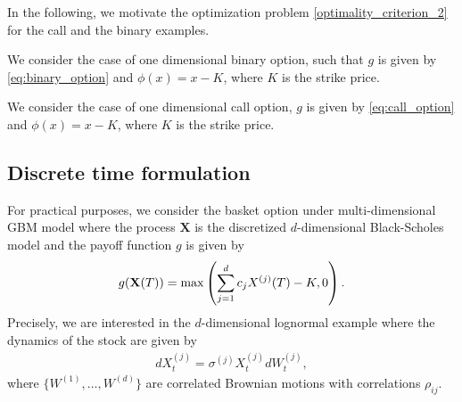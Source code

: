 In the following, we motivate the optimization problem \eqref{optimality_criterion_2} for the call and the binary examples.
\begin{example}
We consider the case of one dimensional binary option, such that $g$ is given by \eqref{eq:binary_option} and  $\phi(x)=x-K$, where $K$ is the strike price.  
\end{example} 
\begin{example}
We consider the case of one dimensional call option,  $	g$ is given by \eqref{eq:call_option} and $\phi(x)=x-K$, where $K$ is the strike price. 
\end{example} 

\subsection{Discrete time formulation}\label{sec:Discrete time, practical motivation}
For practical purposes, we consider the basket option under multi-dimensional GBM model where the process $\mathbf{X}$ is the discretized $d$-dimensional Black-Scholes model and the payoff function $g$ is given by
\begin{align}
	g(\mathbf{X}(T))=\max\left(\sum_{j=1}^{d} c_{j} X^{(j)}(T)-K,0  \right)	.
\end{align}
Precisely, we are interested in the  $d$-dimensional lognormal example where the dynamics of the stock are given by
\begin{align}\label{lognormal_dynamics_basket}
	dX^{(j)}_t=\sigma^{(j)} X^{(j)}_t dW^{(j)}_t,
\end{align}
where $\{W^{(1)}, \dots,W^{(d)}\}$ are correlated Brownian motions with correlations $\rho_{ij}$.


